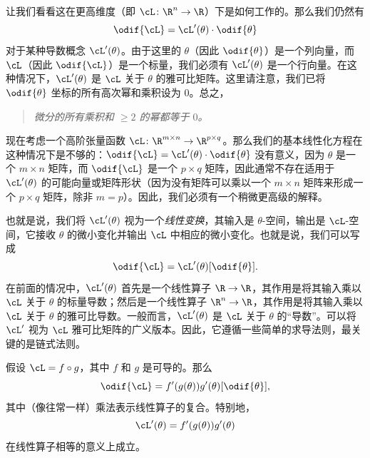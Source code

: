 \documentclass[../../book-main_zh.tex]{subfiles}
\begin{document}
让我们看看这在更高维度（即 \(\cL \colon \R^{n} \to \R\)）下是如何工作的。那么我们仍然有
\begin{equation}
    \odif{\cL} = \cL^{\prime}(\theta)\cdot\odif{\theta}
\end{equation}
对于某种导数概念 \(\cL^{\prime}(\theta)\)。由于这里的 \(\theta\)（因此 \(\odif{\theta}\)）是一个列向量，而 \(\cL\)（因此 \(\odif{\cL}\)）是一个标量，我们必须有 \(\cL^{\prime}(\theta)\) 是一个行向量。在这种情况下，\(\cL^{\prime}(\theta)\) 是 \(\cL\) 关于 \(\theta\) 的雅可比矩阵。这里请注意，我们已将 \(\odif{\theta}\) 坐标的所有高次幂和乘积设为 \(0\)。总之，
\begin{quote}
    \centering
    \textit{微分的所有乘积和 \(\geq 2\) 的幂都等于 \(0\)。}
\end{quote}

现在考虑一个高阶张量函数 \(\cL \colon \R^{m \times n} \to \R^{p \times q}\)。那么我们的基本线性化方程在这种情况下是不够的：\(\odif{\cL} = \cL^{\prime}(\theta) \cdot
\odif{\theta}\) 没有意义，因为 \(\theta\) 是一个 \(m \times n\) 矩阵，而 \(\odif{\cL}\) 是一个 \(p \times q\) 矩阵，因此通常不存在适用于 \(\cL^{\prime}(\theta)\) 的可能向量或矩阵形状（因为没有矩阵可以乘以一个 \(m \times n\) 矩阵来形成一个 \(p \times q\) 矩阵，除非 \(m = p\)）。因此，我们必须有一个稍微更高级的解释。

也就是说，我们将 \(\cL^{\prime}(\theta)\) 视为一个\textit{线性变换}，其输入是 \(\theta\)-空间，输出是 \(\cL\)-空间，它接收 \(\theta\) 的微小变化并输出 \(\cL\) 中相应的微小变化。也就是说，我们可以写成
\begin{equation}
    \odif{\cL} = \cL^{\prime}(\theta)[\odif{\theta}].
\end{equation}
在前面的情况中，\(\cL^{\prime}(\theta)\) 首先是一个线性算子 \(\R \to \R\)，其作用是将其输入乘以 \(\cL\) 关于 \(\theta\) 的标量导数；然后是一个线性算子 \(\R^{n} \to \R\)，其作用是将其输入乘以 \(\cL\) 关于 \(\theta\) 的雅可比导数。一般而言，\(\cL^{\prime}(\theta)\) 是 \(\cL\) 关于 \(\theta\) 的“导数”。可以将 \(\cL^{\prime}\) 视为 \(\cL\) 雅可比矩阵的广义版本。因此，它遵循一些简单的求导法则，最关键的是链式法则。

\begin{theorem}[微分链式法则]
    假设 \(\cL = f \circ g\)，其中 \(f\) 和 \(g\) 是可导的。那么
    \begin{equation}
        \odif{\cL} = f^{\prime}(g(\theta))g^{\prime}(\theta)[\odif{\theta}],
    \end{equation}
    其中（像往常一样）乘法表示线性算子的复合。特别地，
    \begin{equation}
        \cL^{\prime}(\theta) = f^{\prime}(g(\theta))g^{\prime}(\theta)
    \end{equation}
    在线性算子相等的意义上成立。
\end{theorem}
\end{document}
